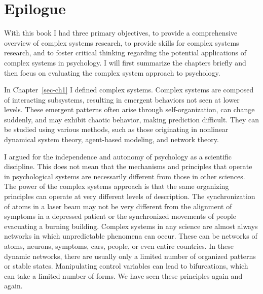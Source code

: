 \documentclass[
  a4paper,
  DIV=11,
  numbers=noendperiod]{scrreprt}
\begin{document}

\hypertarget{sec-ch8}{%
\chapter{Epilogue}\label{sec-ch8}}

With this book I had three primary objectives, to provide a
comprehensive overview of complex systems research, to provide skills
for complex systems research, and to foster critical thinking regarding
the potential applications of complex systems in psychology. I will
first summarize the chapters briefly and then focus on evaluating the
complex system approach to psychology.

In Chapter~\ref{sec-ch1} I defined complex systems. Complex systems are
composed of interacting subsystems, resulting in emergent behaviors not
seen at lower levels. These emergent patterns often arise through
self-organization, can change suddenly, and may exhibit chaotic
behavior, making prediction difficult. They can be studied using various
methods, such as those originating in nonlinear dynamical system theory,
agent-based modeling, and network theory.

I argued for the independence and autonomy of psychology as a scientific
discipline. This does not mean that the mechanisms and principles that
operate in psychological systems are necessarily different from those in
other sciences. The power of the complex systems approach is that the
same organizing principles can operate at very different levels of
description. The synchronization of atoms in a laser beam may not be
very different from the alignment of symptoms in a depressed patient or
the synchronized movements of people evacuating a burning building.
Complex systems in any science are almost always networks in which
unpredictable phenomena can occur. These can be networks of atoms,
neurons, symptoms, cars, people, or even entire countries. In these
dynamic networks, there are usually only a limited number of organized
patterns or stable states. Manipulating control variables can lead to
bifurcations, which can take a limited number of forms. We have seen
these principles again and again.
\end{document}
